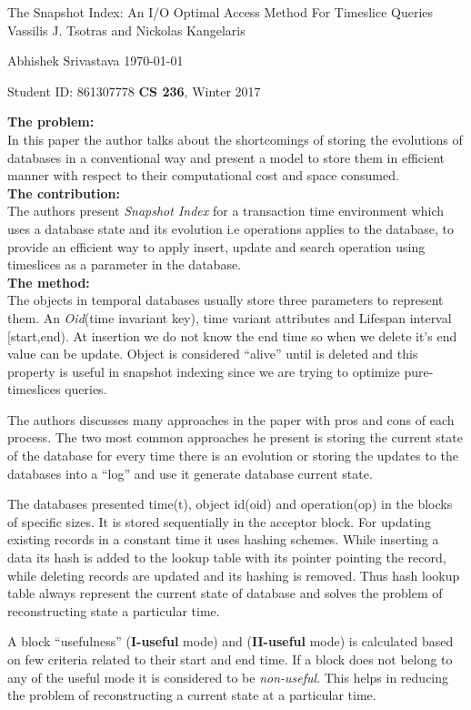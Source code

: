 \documentclass[a4paper,11pt, twoside]{article}
\renewcommand{\maketitle}{%
 	\Large
 	\begin{center}
 	The Snapshot Index: An I/O Optimal Access Method For Timeslice Queries\\	
 	\normalsize Vassilis J. Tsotras and Nickolas Kangelaris
 	\end{center}
 
 	\Large
	Abhishek Srivastava
	\hfill
	\normalsize
	\today
 	\par
 	Student ID: 861307778
 	\hfill
 	\textbf{CS 236}, Winter 2017
 	\par 	
 	\hrulefill
 	\par
 	}
\begin{document}
\thispagestyle{empty}
	
\maketitle
\textbf{The problem:}\\
In this paper the author talks about the shortcomings of storing the evolutions of databases in a conventional way and present a model to store them in efficient manner with respect to their computational cost and space consumed.\\   

\textbf{The contribution:}\\
The authors present \emph{Snapshot Index} for a transaction time environment which uses a database state and its evolution i.e operations applies to the database, to provide an efficient way to apply insert, update and search operation using timeslices as a parameter in the database.\\
 
\textbf{The method:}\\
The objects in temporal databases usually store three parameters to represent them. An \emph{Oid}(time invariant key), time variant attributes and Lifespan interval [start,end). At insertion we do not know the end time so when we delete it's end value can be update. Object is considered ``alive'' until is deleted and this property is useful in snapshot indexing since we are trying to optimize pure-timeslices queries. 

The authors discusses many approaches in the paper with pros and cons of each process. The two most common approaches he present is storing the current state of the database for every time there is an evolution or storing the updates to the databases into a ``log'' and use it generate database current state.  

The databases presented time(t), object id(oid) and operation(op) in the blocks of specific sizes. It is stored sequentially in the acceptor block. For updating existing records in a constant time it uses hashing schemes. While inserting a data its hash is added to the lookup table with its pointer pointing the record, while deleting records are updated and its hashing is removed. Thus hash lookup table always represent the current state of database and solves the problem of reconstructing state a particular time.

A block ``usefulness'' (\textbf{I-useful} mode) and (\textbf{II-useful} mode) is calculated based on few criteria related to their start and end time. If a block does not belong to any of the useful mode it is considered to be \emph{non-useful}. This helps in reducing the problem of reconstructing a current state at a particular time. 
\end{document}
